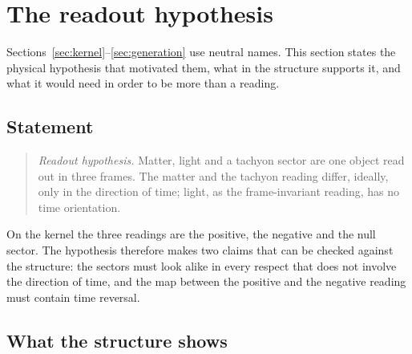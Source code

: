 \section{The readout hypothesis}\label{sec:readout}

Sections~\ref{sec:kernel}--\ref{sec:generation} use neutral names.  This section states the physical hypothesis that motivated them, what in
the structure supports it, and what it would need in order to be more than a reading.

\subsection{Statement}

\begin{quote}
\emph{Readout hypothesis.}  Matter, light and a tachyon sector are one object read out in three frames.  The matter and the tachyon reading
differ, ideally, only in the direction of time; light, as the frame-invariant reading, has no time orientation.
\end{quote}

On the kernel the three readings are the positive, the negative and the null sector.  The hypothesis therefore makes two claims that can
be checked against the structure: the sectors must look alike in every respect that does not involve the direction of time, and the map
between the positive and the negative reading must contain time reversal.

\subsection{What the structure shows}

